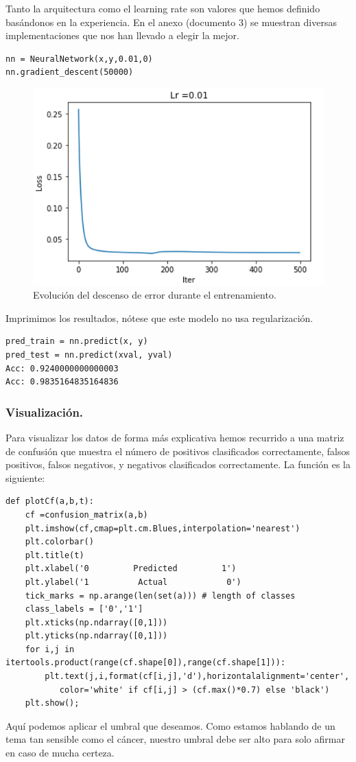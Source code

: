 \documentclass[a4paper,11pt]{article}
\begin{document}
\noindent
Tanto la arquitectura como el learning rate son valores que hemos definido basándonos en la experiencia. En el anexo (documento 3) se muestran diversas implementaciones que nos han llevado a elegir la mejor.
\begin{lstlisting}
nn = NeuralNetwork(x,y,0.01,0)
nn.gradient_descent(50000)
\end{lstlisting}
\begin{figure}[H]
\centering
\includegraphics[scale=0.6]{Annotation 2020-03-23 190119.png}
\caption{Evolución del descenso de error durante el entrenamiento.}
\end{figure}
\noindent
Imprimimos los resultados, nótese que este modelo no usa regularización.
\begin{lstlisting}
pred_train = nn.predict(x, y)
pred_test = nn.predict(xval, yval)
Acc: 0.9240000000000003
Acc: 0.9835164835164836
\end{lstlisting}


\subsubsection{Visualización.}
Para visualizar los datos de forma más explicativa hemos recurrido a una matriz de confusión que muestra el número de positivos clasificados correctamente, falsos positivos, falsos negativos, y  negativos clasificados correctamente. La función es la siguiente:
\begin{lstlisting}
def plotCf(a,b,t):
    cf =confusion_matrix(a,b)
    plt.imshow(cf,cmap=plt.cm.Blues,interpolation='nearest')
    plt.colorbar()
    plt.title(t)
    plt.xlabel('0         Predicted         1')
    plt.ylabel('1          Actual            0')
    tick_marks = np.arange(len(set(a))) # length of classes
    class_labels = ['0','1']
    plt.xticks(np.ndarray([0,1]))
    plt.yticks(np.ndarray([0,1]))
    for i,j in itertools.product(range(cf.shape[0]),range(cf.shape[1])):
        plt.text(j,i,format(cf[i,j],'d'),horizontalalignment='center',
           color='white' if cf[i,j] > (cf.max()*0.7) else 'black')
    plt.show();
\end{lstlisting}
Aquí podemos aplicar el umbral que deseamos. Como estamos hablando de un tema tan sensible como el cáncer, nuestro umbral debe ser alto para solo afirmar en caso de mucha certeza.
\end{document}
